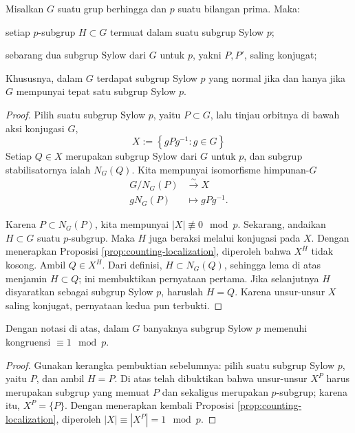 \begin{theorem}
	Misalkan $G$ suatu grup berhingga dan $p$ suatu bilangan prima. Maka:
	\begin{compactenum}[(i)]
		\item setiap $p$-subgrup $H \subset G$ termuat dalam suatu subgrup Sylow $p$;
		\item sebarang dua subgrup Sylow dari $G$ untuk $p$, yakni $P, P'$, saling konjugat;
	\end{compactenum}
	Khususnya, dalam $G$ terdapat subgrup Sylow $p$ yang normal jika dan hanya jika $G$ mempunyai tepat satu subgrup Sylow $p$.
\end{theorem}
\begin{proof}
	Pilih suatu subgrup Sylow $p$, yaitu $P \subset G$, lalu tinjau orbitnya di bawah aksi konjugasi $G$,
	\[ X := \left\{ gPg^{-1} : g \in G \right\} \]
	Setiap $Q \in X$ merupakan subgrup Sylow dari $G$ untuk $p$, dan subgrup stabilisatornya ialah $N_G(Q)$. Kita mempunyai isomorfisme himpunan-$G$
	\begin{align*}
		G/N_G(P) & \stackrel{\sim}{\longrightarrow} X \\
		g N_G(P) & \longmapsto gPg^{-1}.
	\end{align*}

	Karena $P \subset N_G(P)$, kita mempunyai $|X| \not\equiv 0 \mod p$. Sekarang, andaikan $H \subset G$ suatu $p$-subgrup. Maka $H$ juga beraksi melalui konjugasi pada $X$. Dengan menerapkan Proposisi \ref{prop:counting-localization}, diperoleh bahwa $X^H$ tidak kosong. Ambil $Q \in X^H$. Dari definisi, $H \subset N_G(Q)$, sehingga lema di atas menjamin $H \subset Q$; ini membuktikan pernyataan pertama. Jika selanjutnya $H$ disyaratkan sebagai subgrup Sylow $p$, haruslah $H = Q$. Karena unsur-unsur $X$ saling konjugat, pernyataan kedua pun terbukti.
\end{proof}

\begin{theorem}
	Dengan notasi di atas, dalam $G$ banyaknya subgrup Sylow $p$ memenuhi kongruensi $\equiv 1 \mod p$.
\end{theorem}
\begin{proof}
	Gunakan kerangka pembuktian sebelumnya: pilih suatu subgrup Sylow $p$, yaitu $P$, dan ambil $H = P$. Di atas telah dibuktikan bahwa unsur-unsur $X^P$ harus merupakan subgrup yang memuat $P$ dan sekaligus merupakan $p$-subgrup; karena itu, $X^P = \{P\}$. Dengan menerapkan kembali Proposisi \ref{prop:counting-localization}, diperoleh $|X| \equiv \left\lvert X^P \right\rvert = 1 \mod p$.
\end{proof}

